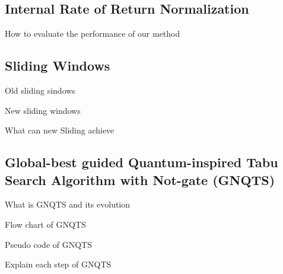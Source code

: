 \documentclass[../main.tex]{subfiles}
\begin{document}



\subsection{Internal Rate of Return Normalization}
How to evaluate the performance of our method
\subsection{Sliding Windows}
Old sliding sindows

New sliding windows

What can new Sliding achieve
\subsection{Global-best guided Quantum-inspired Tabu Search Algorithm with Not-gate (GNQTS)}
What is GNQTS and its evolution

Flow chart of GNQTS

Pseudo code of GNQTS

Explain each step of GNQTS
\end{document}
